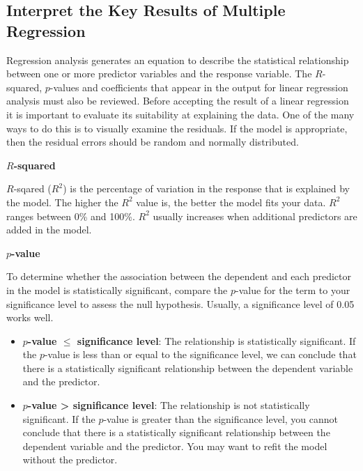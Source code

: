 \documentclass[10pt,b5paper,]{book}
\providecommand{\tightlist}{%
  \setlength{\itemsep}{0pt}\setlength{\parskip}{0pt}}
\theoremstyle{definition}
\theoremstyle{definition}
\theoremstyle{definition}
\theoremstyle{remark}
\begin{document}
\hypertarget{interpret-the-key-results-of-multiple-regression}{%
\subsection{Interpret the Key Results of Multiple
Regression}\label{interpret-the-key-results-of-multiple-regression}}

Regression analysis generates an equation to describe the statistical
relationship between one or more predictor variables and the response
variable. The \(R\)-squared, \(p\)-values and coefficients that appear
in the output for linear regression analysis must also be reviewed.
Before accepting the result of a linear regression it is important to
evaluate its suitability at explaining the data. One of the many ways to
do this is to visually examine the residuals. If the model is
appropriate, then the residual errors should be random and normally
distributed.

\textbf{\(R\)-squared}

\(R\)-sqared (\(R^2\)) is the percentage of variation in the response
that is explained by the model. The higher the \(R^2\) value is, the
better the model fits your data. \(R^2\) ranges between 0\% and 100\%.
\(R^2\) usually increases when additional predictors are added in the
model.

\textbf{\(p\)-value}

To determine whether the association between the dependent and each
predictor in the model is statistically significant, compare the
\(p\)-value for the term to your significance level to assess the null
hypothesis. Usually, a significance level of 0.05 works well.

\begin{itemize}
\tightlist
\item
  \textbf{\(p\)-value \(\leq\) significance level}: The relationship is
  statistically significant. If the \(p\)-value is less than or equal to
  the significance level, we can conclude that there is a statistically
  significant relationship between the dependent variable and the
  predictor.
\item
  \textbf{\(p\)-value \textgreater{} significance level}: The
  relationship is not statistically significant. If the \(p\)-value is
  greater than the significance level, you cannot conclude that there is
  a statistically significant relationship between the dependent
  variable and the predictor. You may want to refit the model without
  the predictor.
\end{itemize}
\end{document}

